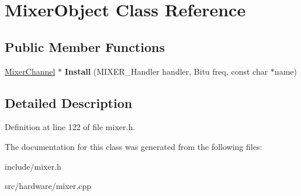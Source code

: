 \hypertarget{classMixerObject}{\section{Mixer\-Object Class Reference}
\label{classMixerObject}
}
\subsection*{Public Member Functions}
\begin{DoxyCompactItemize}
\item 
\hypertarget{classMixerObject_a69627e7e471b0afbc613a8d2b2b9221c}{\hyperlink{classMixerChannel}{Mixer\-Channel} $\ast$ {\bfseries Install} (M\-I\-X\-E\-R\-\_\-\-Handler handler, Bitu freq, const char $\ast$name)}\label{classMixerObject_a69627e7e471b0afbc613a8d2b2b9221c}

\end{DoxyCompactItemize}


\subsection{Detailed Description}


Definition at line 122 of file mixer.\-h.



The documentation for this class was generated from the following files\-:\begin{DoxyCompactItemize}
\item 
include/mixer.\-h\item 
src/hardware/mixer.\-cpp\end{DoxyCompactItemize}
